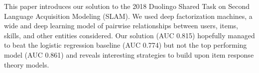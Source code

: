 This paper introduces our solution to the 2018 Duolingo Shared Task on Second Language Acquisition Modeling (SLAM). We used deep factorization machines, a wide and deep learning model of pairwise relationships between users, items, skills, and other entities considered. Our solution (AUC 0.815) hopefully managed to beat the logistic regression baseline (AUC 0.774) but not the top performing model (AUC 0.861) and reveals interesting strategies to build upon item response theory models.
